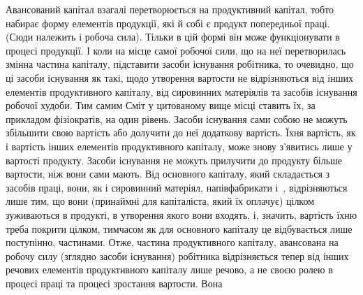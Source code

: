 Авансований капітал взагалі перетворюється на продуктивний капітал,
тобто набирає форму елементів продукції, які й собі є продукт попередньої
праці. (Сюди належить і робоча сила). Тільки в цій формі він
може функціонувати в процесі продукції. І коли на місце самої робочої
сили, що на неї перетворилась змінна частина капіталу, підставити засоби
існування робітника, то очевидно, що ці засоби існування як такі,
щодо утворення вартости не відрізняються від інших елементів продуктивного
капіталу, від сировинних матеріялів та засобів існування робочої
худоби. Тим самим Сміт у цитованому вище місці ставить їх, за прикладом
фізіократів, на один рівень. Засоби існування сами собою не можуть
збільшити свою вартість або долучити до неї додаткову вартість. Їхня
вартість, як і вартість інших елементів продуктивного капіталу, може
знову з’явитись лише у вартості продукту. Засоби існування не можуть
прилучити до продукту більше вартости, ніж вони сами мають. Від основного
капіталу, який складається з засобів праці, вони, як і сировинний
матеріял, напівфабрикати і~, відрізняються лише тим, що вони
(принаймні для капіталіста, який їх оплачує) цілком зуживаються в продукті,
в утворення якого вони входять, і, значить, вартість їхню треба
покрити цілком, тимчасом як для основного капіталу це відбувається
лише поступінно, частинами. Отже, частина продуктивного капіталу,
авансована на робочу силу (зглядно засоби існування) робітника відрізняється
тепер від інших речових елементів продуктивного капіталу лише речово, а
не своєю ролею в процесі праці та процесі зростання вартости. Вона
\parbreak{}  %
